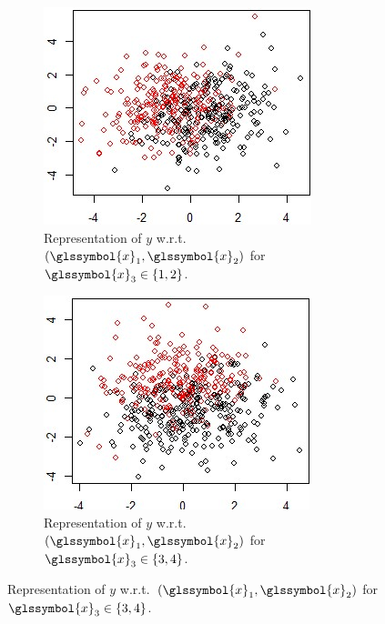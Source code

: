 \begin{figure}
\begin{subfigure}[t]{0.32\textwidth}
\includegraphics[width=\textwidth]{figures/chapitre6/graph_simu_1.jpg}
\caption{Representation of $y$ w.r.t.\ $(\glssymbol{x}_1,\glssymbol{x}_2)$ for $\glssymbol{x}_3 \in \{1,2\}$.}
\label{fig:simu1}
\end{subfigure}
\begin{subfigure}[t]{0.32\textwidth}
\includegraphics[width=\textwidth]{figures/chapitre6/graph_simu_2.jpg}
\caption{Representation of $y$ w.r.t.\ $(\glssymbol{x}_1,\glssymbol{x}_2)$ for $\glssymbol{x}_3 \in \{3,4\}$.}

\end{subfigure}
\end{figure}
